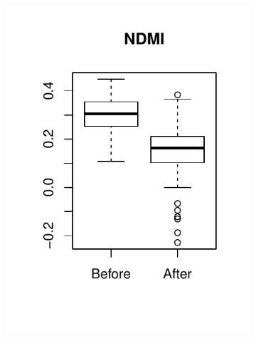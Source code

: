 \documentclass[a4paper,12pt]{scrbook}
\begin{document}
\begin{figure}
\begin{subfigure}[b]{0.32\textwidth}
    \includegraphics[width=\textwidth]{thesis-figures/04-boxplot-ndmi}
  \end{subfigure}
  \begin{subfigure}[b]{0.32\textwidth}

\end{subfigure}
\end{figure}
\end{document}
